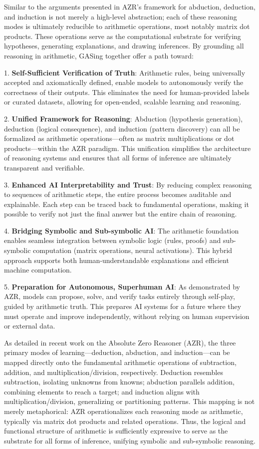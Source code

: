 Similar to the arguments presented in AZR's framework for abduction, deduction, and induction is not merely a high-level abstraction; each of these reasoning modes is ultimately reducible to arithmetic operations, most notably matrix dot products. These operations serve as the computational substrate for verifying hypotheses, generating explanations, and drawing inferences. By grounding all reasoning in arithmetic, GASing together offer a path toward:

1. \textbf{Self-Sufficient Verification of Truth}: Arithmetic rules, being universally accepted and axiomatically defined, enable models to autonomously verify the correctness of their outputs. This eliminates the need for human-provided labels or curated datasets, allowing for open-ended, scalable learning and reasoning.

2. \textbf{Unified Framework for Reasoning}: Abduction (hypothesis generation), deduction (logical consequence), and induction (pattern discovery) can all be formalized as arithmetic operations—often as matrix multiplications or dot products—within the AZR paradigm. This unification simplifies the architecture of reasoning systems and ensures that all forms of inference are ultimately transparent and verifiable.

3. \textbf{Enhanced AI Interpretability and Trust}: By reducing complex reasoning to sequences of arithmetic steps, the entire process becomes auditable and explainable. Each step can be traced back to fundamental operations, making it possible to verify not just the final answer but the entire chain of reasoning.

4. \textbf{Bridging Symbolic and Sub-symbolic AI}: The arithmetic foundation enables seamless integration between symbolic logic (rules, proofs) and sub-symbolic computation (matrix operations, neural activations). This hybrid approach supports both human-understandable explanations and efficient machine computation.

5. \textbf{Preparation for Autonomous, Superhuman AI}: As demonstrated by AZR, models can propose, solve, and verify tasks entirely through self-play, guided by arithmetic truth. This prepares AI systems for a future where they must operate and improve independently, without relying on human supervision or external data.

As detailed in recent work on the Absolute Zero Reasoner (AZR), the three primary modes of learning—deduction, abduction, and induction—can be mapped directly onto the fundamental arithmetic operations of subtraction, addition, and multiplication/division, respectively. Deduction resembles subtraction, isolating unknowns from knowns; abduction parallels addition, combining elements to reach a target; and induction aligns with multiplication/division, generalizing or partitioning patterns. This mapping is not merely metaphorical: AZR operationalizes each reasoning mode as arithmetic, typically via matrix dot products and related operations. Thus, the logical and functional structure of arithmetic is sufficiently expressive to serve as the substrate for all forms of inference, unifying symbolic and sub-symbolic reasoning.

